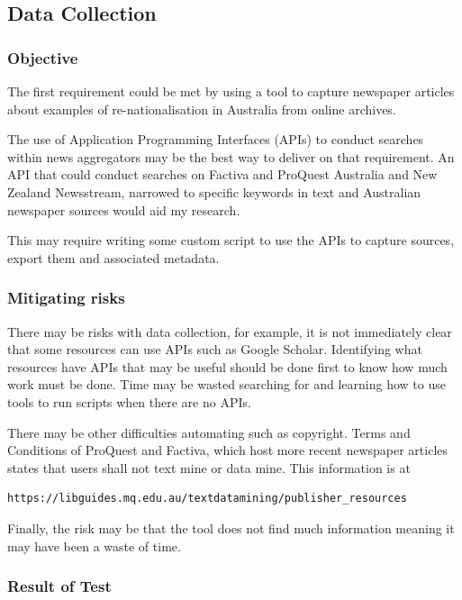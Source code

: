 \documentclass{article}
\begin{document}
\subsection*{Data Collection}
\subsubsection*{Objective}

The first requirement could be met by using a tool to capture newspaper articles about examples of re-nationalisation in Australia from online archives.\par

The use of Application Programming Interfaces (APIs) to conduct searches within news aggregators may be the best way to deliver on that requirement. An API that could conduct searches on Factiva and ProQuest Australia and New Zealand Newsstream, narrowed to specific keywords in text and Australian newspaper sources would aid my research.\par

This may require writing some custom script to use the APIs to capture sources, export them and associated metadata.\par 

\subsubsection*{Mitigating risks}

There may be risks with data collection, for example, it is not immediately clear that some resources can use APIs such as Google Scholar. Identifying what resources have APIs that may be useful should be done first to know how much work must be done. Time may be wasted searching for and learning how to use tools to run scripts when there are no APIs.\par

There may be other difficulties automating such as copyright. Terms and Conditions of ProQuest and Factiva, which host more recent newspaper articles states that users shall not text mine or data mine. This information is at \begin{verbatim}https://libguides.mq.edu.au/textdatamining/publisher_resources\end{verbatim}

Finally, the risk may be that the tool does not find much information meaning it may have been a waste of time.\par

\subsubsection*{Result of Test}
\end{document}
